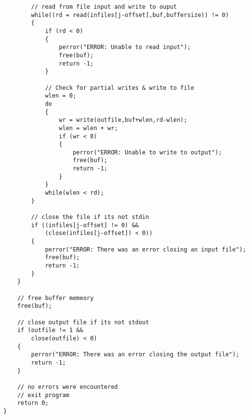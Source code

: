 \documentclass[12pt]{article}
\begin{document}
\begin{lstlisting}
		// read from file input and write to ouput
		while((rd = read(infiles[j-offset],buf,buffersize)) != 0)
		{
			if (rd < 0)
			{
				perror("ERROR: Unable to read input");
				free(buf);
				return -1;
			}

			// Check for partial writes & write to file
			wlen = 0;
			do
			{
				wr = write(outfile,buf+wlen,rd-wlen);
				wlen = wlen + wr;
				if (wr < 0)
				{
					perror("ERROR: Unable to write to output");
					free(buf);
					return -1;
				}	
			}
			while(wlen < rd);
		}

		// close the file if its not stdin
		if ((infiles[j-offset] != 0) &&
			(close(infiles[j-offset]) < 0))
		{
			perror("ERROR: There was an error closing an input file");
			free(buf);
			return -1;
		}
	}

	// free buffer memeory
	free(buf);

	// close output file if its not stdout
	if (outfile != 1 &&
		close(outfile) < 0)
	{
		perror("ERROR: There was an error closing the output file");
		return -1;
	}

	// no errors were encountered
	// exit program
	return 0; 
}
\end{lstlisting}
\end{document}
